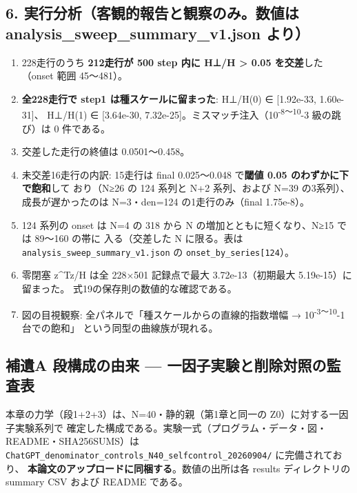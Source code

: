 \documentclass[
  a4paper,
]{ltjsarticle}
\providecommand{\tightlist}{%
  \setlength{\itemsep}{0pt}\setlength{\parskip}{0pt}}
\begin{document}
\subsection{6. 実行分析（客観的報告と観察のみ。数値は
analysis\_sweep\_summary\_v1.json
より）}\label{ux5b9fux884cux5206ux6790ux5ba2ux89b3ux7684ux5831ux544aux3068ux89b3ux5bdfux306eux307fux6570ux5024ux306f-analysis_sweep_summary_v1.json-ux3088ux308a}

\begin{enumerate}
\def\labelenumi{\arabic{enumi}.}
\tightlist
\item
  228走行のうち \textbf{212走行が 500 step 内に H⊥/H \textgreater{} 0.05
  を交差}した（onset 範囲 45〜481）。
\item
  \textbf{全228走行で step1 は種スケールに留まった}: H⊥/H(0) ∈
  {[}1.92e-33, 1.60e-31{]}、 H⊥/H(1) ∈ {[}3.64e-30,
  7.32e-25{]}。ミスマッチ注入（10\textsuperscript{-8〜10}-3 級の跳び）は
  0 件である。
\item
  交差した走行の終値は 0.0501〜0.458。
\item
  未交差16走行の内訳: 15走行は final 0.025〜0.048 で\textbf{閾値 0.05
  のわずかに下で飽和}して おり（N≥26 の 124 系列と N+2 系列、および N=39
  の3系列）、成長が遅かったのは N=3・den=124 の1走行のみ（final
  1.75e-8）。
\item
  124 系列の onset は N=4 の 318 から N の増加とともに短くなり、N≥15
  では 89〜160 の帯に 入る（交差した N に限る。表は
  \texttt{analysis\_sweep\_summary\_v1.json} の
  \texttt{onset\_by\_series{[}\textquotesingle{}124\textquotesingle{}{]}}）。
\item
  零閉塞 \textbar z\^{}Tz\textbar/H は全 228×501 記録点で最大
  3.72e-13（初期最大 5.19e-15）に留まった。
  式19の保存則の数値的な確認である。
\item
  図の目視観察: 全パネルで「種スケールからの直線的指数増幅 →
  10\textsuperscript{-3〜10}-1 台での飽和」 という同型の曲線族が現れる。
\end{enumerate}

\subsection{補遺A 段構成の由来 ---
一因子実験と削除対照の監査表}\label{ux88dcux907aa-ux6bb5ux69cbux6210ux306eux7531ux6765-ux4e00ux56e0ux5b50ux5b9fux9a13ux3068ux524aux9664ux5bfeux7167ux306eux76e3ux67fbux8868}

本章の力学（段1+2+3）は、N=40・静的親（第1章と同一の
Z0）に対する一因子実験系列で
確定した構成である。実験一式（プログラム・データ・図・README・SHA256SUMS）は
\texttt{ChatGPT\_denominator\_controls\_N40\_selfcontrol\_20260904/}
に完備されており、
\textbf{本論文のアップロードに同梱する}。数値の出所は各 results
ディレクトリの summary CSV および README である。
\end{document}
